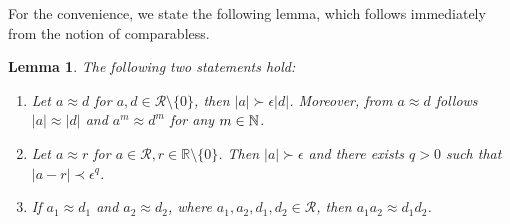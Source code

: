 \documentclass[a4paper,12pt]{amsart}
\newtheorem{lemma}{Lemma}
\theoremstyle{definition}
\newcommand{\R}{\mathcal{R}}
\begin{document}
For the convenience, we state the following lemma, which follows immediately from the notion of comparabless.

\begin{lemma}\label{smalllemma}
The following two statements hold:
\begin{enumerate}
 \item
Let  $a\approx d$ for $a,d\in \R\setminus\{0\}$, then $|a|\succ\epsilon |d|$. Moreover, from $a\approx d$ follows $|a|\approx |d|$ and $a^m\approx d^m$ for any $m\in \Bbb N$.
\item
Let $a\approx r$ for $a\in \R, r\in \mathbb R\setminus\{0\}$. Then $|a|\succ \epsilon$ and there exists $ q>0$ such that $|a-r|\prec \epsilon^q$.
\item
If $a_1\approx d_1$ and $a_2\approx d_2$, where $a_1,a_2,d_1,d_2\in \R$, then $a_1a_2\approx d_1d_2$.
\end{enumerate}
\end{lemma}
\end{document}
